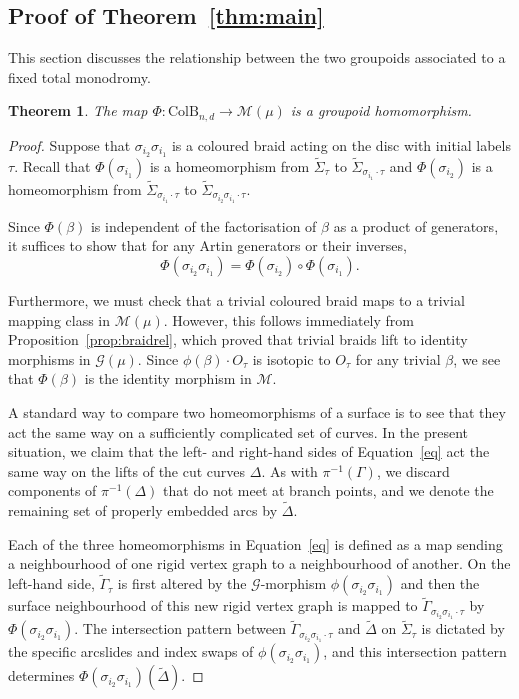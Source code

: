 \documentclass{amsart}
\newtheorem{theorem}{Theorem}[section]
\theoremstyle{definition}
\def\ws{\widetilde{\Sigma}}
\begin{document}
\subsection{Proof of Theorem~\ref{thm:main}}\label{sec:pfmain}

This section discusses the relationship between the two groupoids associated to a fixed total monodromy. 

\begin{theorem}\label{thm:homom2} The map $\Phi: \text{ColB}_{n,d}\rightarrow \mathcal{M}(\mu)$ is a groupoid homomorphism.
\end{theorem}

\begin{proof} 
Suppose that $\sigma_{i_2}\sigma_{i_1}$ is a coloured braid acting on the disc with initial labels $\tau$.  Recall that $\Phi(\sigma_{i_1})$ is a homeomorphism from $\ws_\tau$ to $\ws_{\sigma_{i_1}\cdot \tau}$ and $\Phi(\sigma_{i_2})$ is a homeomorphism from $\ws_{\sigma_{i_1}\cdot \tau}$ to $\ws_{\sigma_{i_2}\sigma_{i_1}\cdot \tau}$. 

Since $\Phi(\beta)$ is independent of the factorisation of $\beta$ as a product of generators, it suffices to show that for any Artin generators or their inverses, \begin{equation}\label{eq}\Phi(\sigma_{i_2}\sigma_{i_1})=\Phi(\sigma_{i_2})\circ\Phi(\sigma_{i_1}).\end{equation}
 
Furthermore, we must check that a trivial coloured braid maps to a trivial mapping class in $\mathcal{M}(\mu)$.  However, this follows immediately from Proposition~\ref{prop:braidrel}, which proved that trivial braids lift to identity morphisms in $\mathcal{G}(\mu)$.  Since $\phi(\beta) \cdot O_\tau$ is isotopic to $O_\tau$ for any trivial $\beta$, we see that $\Phi(\beta)$ is the identity morphism in $\mathcal{M}$.



A standard way to compare two homeomorphisms of a surface is to see that they act the same way on a sufficiently complicated set of curves.  In the present situation, we claim that the left- and right-hand sides of Equation~\ref{eq} act the same way on the lifts of the cut curves $\Delta$.  As with $\pi^{-1}(\Gamma)$, we discard components of $\pi^{-1}(\Delta)$ that do not meet at branch points, and we denote the remaining set of properly embedded arcs by $\widetilde{\Delta}$.  

Each of the three homeomorphisms in Equation~\ref{eq} is defined as a map sending a neighbourhood of one rigid vertex graph to a neighbourhood of another.  On the left-hand side, $\widetilde{\Gamma}_\tau$ is first altered by the $\mathcal{G}$-morphism $\phi(\sigma_{i_2}\sigma_{i_1})$ and then the surface neighbourhood of this new rigid vertex graph is mapped to $\widetilde{\Gamma}_{\sigma_{i_2}\sigma_{i_1}\cdot \tau}$ by $\Phi(\sigma_{i_2}\sigma_{i_1})$.  The intersection pattern between $\widetilde{\Gamma}_{\sigma_{i_2}\sigma_{i_1}\cdot \tau}$ and $\widetilde{\Delta}$ on $\ws_\tau$  is dictated by the specific arcslides and index swaps of $\phi(\sigma_{i_2}\sigma_{i_1})$, and this intersection pattern determines $\Phi(\sigma_{i_2}\sigma_{i_1})(\widetilde{\Delta})$.  


\end{proof}
\end{document}
